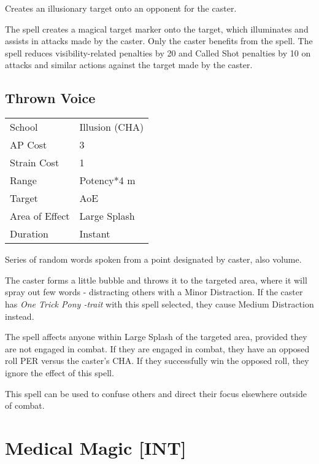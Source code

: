 \documentclass[11pt,a4paper,twocolumn]{book}
\begin{document}
\medskip

Creates an illusionary target onto an opponent for the caster.

The spell creates a magical target marker onto the target, which illuminates and assists in attacks made by the caster. Only the caster benefits from the spell. The spell reduces visibility-related penalties by 20 and Called Shot penalties by 10 on attacks and similar actions against the target made by the caster.

\vfill

\subsection*{Thrown Voice}
{
	\begin{tabu} to 75mm{| X[l,4] | X[l,7] |}
		\hline
		School 			& Illusion (CHA) 				\\
		AP Cost	      	& 3								\\
		Strain Cost     & 1 							\\
		Range     		& Potency*4 m 					\\
		Target      	& AoE							\\
		Area of Effect  & Large Splash 	 				\\
		Duration     	& Instant						\\ \hline
	\end{tabu}
	
}

\medskip

Series of random words spoken from a point designated by caster, also volume.

The caster forms a little bubble and throws it to the targeted area, where it will spray out few words - distracting others with a Minor Distraction. If the caster has \textit{One Trick Pony -trait} with this spell selected, they cause Medium Distraction instead.

The spell affects anyone within Large Splash of the targeted area, provided they are not engaged in combat. If they are engaged in combat, they have an opposed roll PER versus the caster's CHA. If they successfully win the opposed roll, they ignore the effect of this spell.

This spell can be used to confuse others and direct their focus elsewhere outside of combat.

\vfill

\section*{Medical Magic [INT]}
\end{document}
